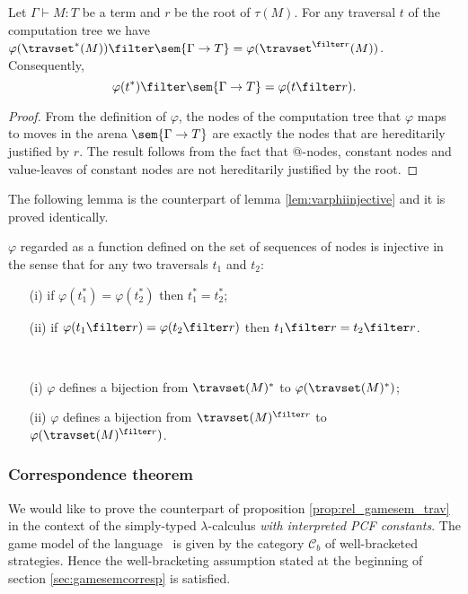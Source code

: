 
\begin{lemma}
\label{lem:SIGMACONST:varphi_filter} Let $\Gamma \vdash M :T$ be a
term and $r$ be the root of $\tau(M)$. For any traversal $t$ of the
computation tree we have $ \varphi(\travset^*(M)) \filter
\sem{\Gamma \rightarrow T} = \varphi(\travset^{\filter
r}(M)) $.
 Consequently,
$$\varphi(t^*) \filter \sem{\Gamma \rightarrow T} = \varphi(t\filter r).$$
\end{lemma}
\begin{proof}
    From the definition of $\varphi$, the nodes of the computation tree that $\varphi$ maps
    to moves in the arena $\sem{\Gamma \rightarrow T}$ are exactly the nodes that are hereditarily justified by $r$.
    The result follows from the fact that @-nodes, constant nodes and value-leaves of constant nodes
    are not hereditarily justified by the root.
\end{proof}


The following lemma is the counterpart of lemma
\ref{lem:varphiinjective} and it is proved identically.
\begin{lemma}
\label{lem:SIGMACONST:varphiinjective} $\varphi$ regarded as a
function defined on the set of sequences of nodes is injective in
the sense that for any two traversals $t_1$ and $t_2$:
\begin{itemize}
\item[(i)] if $\varphi (t_1^* ) = \varphi (t_2^* )$ then $t_1^* =t_2^*$;
\item[(ii)] if $\varphi (t_1 \filter r ) = \varphi (t_2 \filter r )$ then $t_1\filter r = t_2\filter r$.
\end{itemize}
\end{lemma}

\begin{corollary} \
\label{cor:SIGMACONST:varphi_bij}
\begin{itemize}
\item[(i)] $\varphi$ defines a bijection from $\travset(M)^*$
to $\varphi(\travset(M)^*)$;
\item[(ii)] $\varphi$ defines a bijection from $\travset(M)^{\filter r}$ to
$\varphi(\travset(M)^{\filter r})$.
\end{itemize}
\end{corollary}


\subsubsection{Correspondence theorem}
We would like to prove the counterpart of proposition
\ref{prop:rel_gamesem_trav} in the context of the simply-typed
$\lambda$-calculus \emph{with interpreted PCF constants}. The game
model of the language \pcf\ is given by the category $\mathcal{C}_b$
of well-bracketed strategies. Hence the well-bracketing assumption
stated at the beginning of section \ref{sec:gamesemcorresp} is
satisfied.

